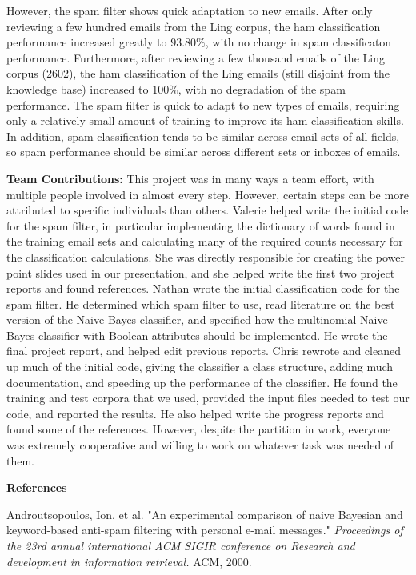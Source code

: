 \documentclass[12pt]{article}
\begin{document}
	However, the spam filter shows quick adaptation to new emails.  After only reviewing a few hundred emails from the Ling corpus, the ham classification performance increased greatly to $93.80\%$, with no change in spam classificaton performance.  Furthermore, after reviewing a few thousand emails of the Ling corpus (2602), the ham classification of the Ling emails (still disjoint from the knowledge base) increased to $100\%$, with no degradation of the spam performance.  The spam filter is quick to adapt to new types of emails, requiring only a relatively small amount of training to improve its ham classification skills.  In addition, spam classification tends to be similar across email sets of all fields, so spam performance should be similar across different sets or inboxes of emails.  
	
 
 \textbf{Team Contributions:} This project was in many ways a team effort, with multiple people
 involved in almost every step.  However, certain steps can be more attributed to specific individuals
 than others.  Valerie helped write the initial code for the spam filter, in particular implementing the 
 dictionary of words found in the training email sets and calculating many of the required counts 
 necessary for the classification calculations.  She was directly responsible for creating the power
 point slides used in our presentation, and she helped write the first two project reports and found
 references.  Nathan wrote the initial classification code for the spam filter.  He determined which
 spam filter to use, read literature on the best version of the Naive Bayes classifier, and 
 specified how the multinomial Naive Bayes classifier with Boolean attributes should be implemented.
 He wrote the final project report, and helped edit previous reports.  Chris rewrote and cleaned up
 much of the initial code, giving the classifier a class structure, adding much documentation, and 
 speeding up the performance of the classifier.  He found the training and test corpora that we used,
 provided the input files needed to test our code, and reported the results.  He also helped write the 
 progress reports and found some of the references.  However, despite the partition in work, everyone
 was extremely cooperative and willing to work on whatever task was needed of them.

\begin{flushleft}
\textbf{References}
\end{flushleft}

\begin{flushleft}
Androutsopoulos, Ion, et al. "An experimental comparison of naive Bayesian and keyword-based anti-spam filtering with personal e-mail messages." \textit{Proceedings of the 23rd annual international ACM SIGIR conference on Research and development in information retrieval.} ACM, 2000.
\end{flushleft}
\end{document}
